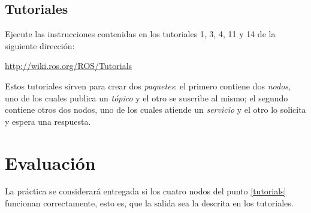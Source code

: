 \documentclass[letterpaper,12pt]{article}
\begin{document}
\subsection{Tutoriales\label{tutorials}}

Ejecute las instrucciones contenidas en los tutoriales 1, 3, 4, 11 y 14 de la siguiente dirección:

\url{http://wiki.ros.org/ROS/Tutorials}

Estos tutoriales sirven para crear dos \textit{paquetes}: el primero contiene dos \textit{nodos}, uno de los cuales publica un \textit{tópico} y el otro se suscribe al mismo; el segundo contiene otros dos nodos, uno de los cuales atiende un \textit{servicio} y el otro lo solicita y espera una respuesta. 

\section{Evaluación}

La práctica se considerará entregada si los cuatro nodos del punto \ref{tutorials} funcionan correctamente, esto es, que la salida sea la descrita en los tutoriales. 
\end{document}
